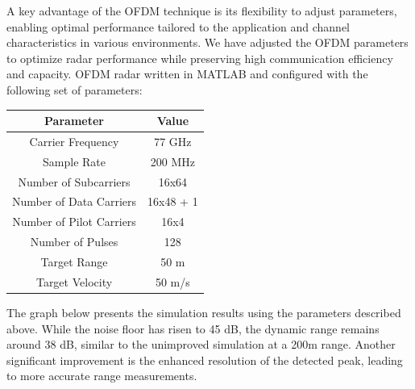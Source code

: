 \documentclass[conference]{IEEEtran}
\begin{document}
A key advantage of the OFDM technique is its flexibility to adjust parameters, enabling optimal performance tailored to the application and channel characteristics in various environments. We have adjusted the OFDM parameters to optimize radar performance while preserving high communication efficiency and capacity.
OFDM radar written in MATLAB and configured with the following set of parameters: 

\begin{center}
\begin{tabular}{|c|c|}
\hline
\textbf {Parameter} & \textbf {Value }\\
\hline
Carrier Frequency & 77 GHz \\
\hline
Sample Rate & 200 MHz \\
\hline
Number of Subcarriers & 16x64\\
\hline
Number of Data Carriers & 16x48 + 1 \\
\hline 
Number of Pilot Carriers & 16x4 \\
\hline 
Number of Pulses & 128 \\
\hline 
Target Range & 50 m \\
\hline 
Target Velocity & 50  m/s\\
\hline 
\end{tabular}
\end{center}


The graph below presents the simulation results using the parameters described above. While the noise floor has risen to 45 dB, the dynamic range remains around 38 dB, similar to the unimproved simulation at a 200m range. Another significant improvement is the enhanced resolution of the detected peak, leading to more accurate range measurements.
\end{document}
